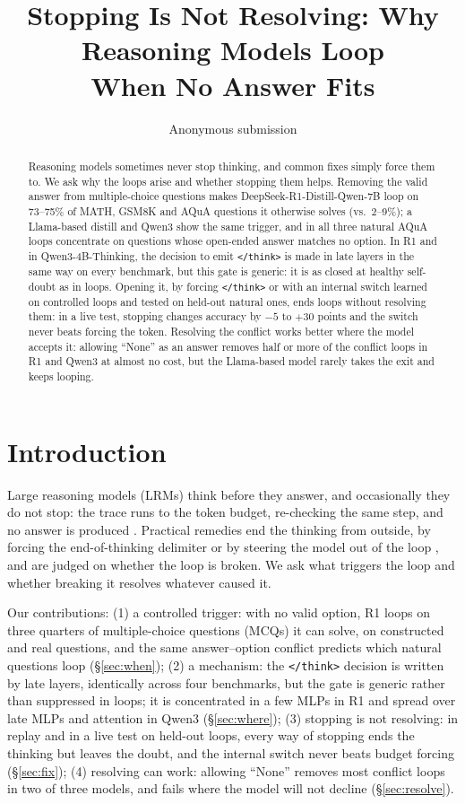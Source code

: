 \documentclass[11pt]{article}
\title{Stopping Is Not Resolving: Why Reasoning Models Loop\\
When No Answer Fits}
\author{Anonymous submission}
\newcommand{\think}{\texttt{</think>}}
\begin{document}
\maketitle

\begin{abstract}
Reasoning models sometimes never stop thinking, and common fixes simply force them to. We ask why
the loops arise and whether stopping them helps. Removing the valid answer from multiple-choice
questions makes DeepSeek-R1-Distill-Qwen-7B loop on 73--75\% of MATH, GSM8K and AQuA questions it
otherwise solves (vs.\ 2--9\%); a Llama-based distill and Qwen3 show the same trigger, and in all three
natural AQuA loops concentrate on questions whose open-ended answer matches no option. In R1 and in Qwen3-4B-Thinking, the decision to
emit \think{} is made in late layers in the same way on every benchmark, but this gate is generic:
it is as closed at healthy self-doubt as in loops. Opening it, by forcing \think{} or with an
internal switch learned on controlled loops and tested on held-out natural ones, ends loops without
resolving them: in a live test, stopping changes accuracy by $-5$ to $+30$ points and the switch
never beats forcing the token. Resolving the conflict works better where the model accepts it: allowing
``None'' as an answer removes half or more of the conflict loops in R1 and Qwen3 at almost no cost,
but the Llama-based model rarely takes the exit and keeps looping.
\end{abstract}

\section{Introduction}
Large reasoning models (LRMs) think before they answer, and occasionally they do not stop: the trace
runs to the token budget, re-checking the same step, and no answer is produced
\citep{duan2026circular}. Practical remedies end the thinking from outside, by forcing the
end-of-thinking delimiter \citep[budget forcing;][]{muennighoff2025s1} or by steering the model out of
the loop \citep{yu2026sophia,zhang2026astray}, and are judged on whether the loop is broken. We ask
what triggers the loop and whether breaking it resolves whatever caused it.

Our contributions: (1) a controlled trigger: with no valid option, R1 loops on three quarters of
multiple-choice questions (MCQs) it can solve, on constructed and real questions, and the same
answer--option conflict predicts which natural questions loop (\S\ref{sec:when}); (2) a mechanism:
the \think{} decision is written by late layers, identically across four benchmarks, but the gate
is generic rather than suppressed in loops; it is concentrated in a few MLPs in R1 and spread over
late MLPs and attention in Qwen3 (\S\ref{sec:where}); (3) stopping is not resolving: in replay and in
a live test on held-out loops, every way of stopping ends the thinking but leaves the doubt, and the
internal switch never beats budget forcing (\S\ref{sec:fix}); (4) resolving can work: allowing ``None''
removes most conflict loops in two of three models, and fails where the model will not decline
(\S\ref{sec:resolve}).
\end{document}
